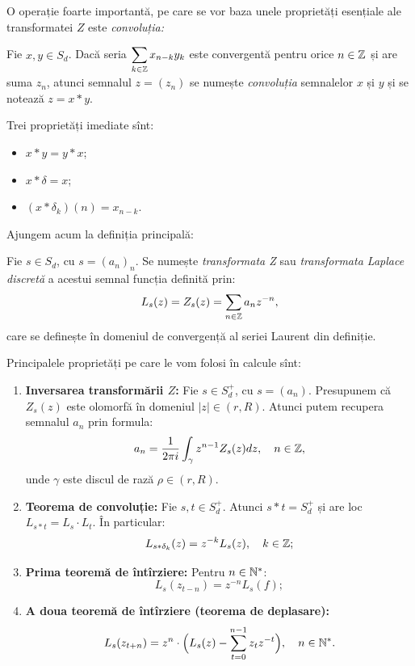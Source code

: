 O operație foarte importantă, pe care se vor baza unele proprietăți esențiale ale
transformatei $ Z $ este \emph{convoluția:} 
\begin{definition}\label{def:convolutie}
  Fie $ x, y \in S_d $. Dacă seria $ \displaystyle\sum_{k \in \mathbb{Z}} x_{n-k} y_k $
  este convergentă pentru orice $ n \in \mathbb{Z} $ și are suma $ z_n $, atunci semnalul
  $ z = (z_n) $ se numește \emph{convoluția} semnalelor $ x $ și $ y $ și
  se notează $ z = x \ast y $.
\end{definition}

Trei proprietăți imediate sînt:
\begin{itemize}
\item $ x \ast y = y \ast x $;
\item $ x \ast \delta = x $;
\item $ (x \ast \delta_k)(n) = x_{n - k} $.
\end{itemize}

Ajungem acum la definiția principală:
\begin{definition}\label{def:z}
  Fie $ s \in S_d $, cu $ s = (a_n)_n $. Se numește \emph{transformata Z} sau
  \emph{transformata Laplace discretă} a acestui semnal funcția definită prin:
  \[
    L_s(z) = Z_s(z) = \sum_{n \in \mathbb{Z}} a_n z^{-n},
  \]
  care se definește în domeniul de convergență al seriei Laurent din definiție.
\end{definition}

Principalele proprietăți pe care le vom folosi în calcule sînt:
\begin{enumerate}[(1)]
\item \textbf{Inversarea transformării $ Z $:} Fie $ s \in S_d^+ $, cu $ s = (a_n) $.
  Presupunem că $ Z_s(z) $ este olomorfă în domeniul $ |z| \in (r, R) $. Atunci
  putem recupera semnalul $ a_n $ prin formula:
  \[
    a_n = \dfrac{1}{2 \pi i} \int_{\gamma} z^{n-1} Z_s(z) dz, \quad n \in \mathbb{Z},
  \]
  unde $ \gamma $ este discul de rază $ \rho \in (r, R) $.
\item \textbf{Teorema de convoluție:} Fie $ s, t \in S_d^+ $. Atunci $ s \ast t = S_d^+ $
  și are loc $ L_{s \ast t} = L_s \cdot L_t $. În particular:
  \[
    L_{s \ast \delta_k}(z) = z^{-k} L_s(z), \quad k \in \mathbb{Z};
  \]
\item \textbf{Prima teoremă de întîrziere:} Pentru $ n\in \mathbb{N}^\ast $:
  \[
    L_s( z_{t - n}) = z^{-n} L_s(f);
  \]
\item \textbf{A doua teoremă de întîrziere (teorema de deplasare):}
  \[
    L_s(z_{t + n}) = z^n \cdot \Big( L_s(z) - \sum_{t = 0}^{n-1} z_t z^{-t} \Big), \quad n \in \mathbb{N}^\ast.
  \]
\end{enumerate}

